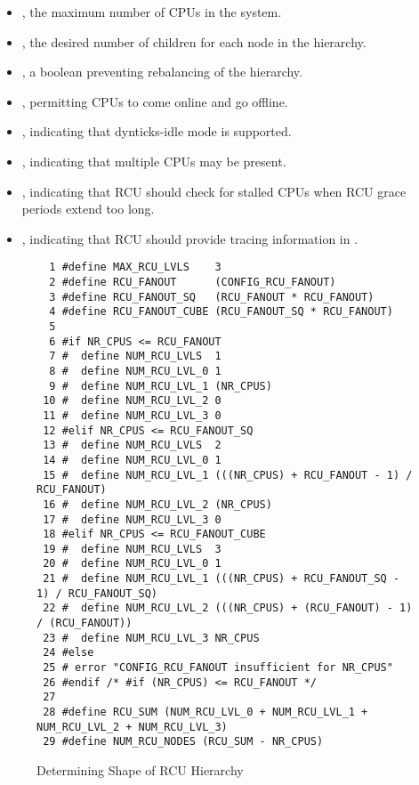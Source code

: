 \begin{itemize}
\item	{}, the maximum number of CPUs in the system.
\item	{}, the desired number of children for
	each node in the  hierarchy.
\item	{}, a boolean preventing rebalancing
	of the  hierarchy.
\item	{}, permitting CPUs to come online and go
	offline.
\item	{}, indicating that dynticks-idle mode is supported.
\item	{}, indicating that multiple CPUs may be present.
\item	{}, indicating that RCU should
	check for stalled CPUs when RCU grace periods extend too long.
\item	{}, indicating that RCU should provide
	tracing information in .
\end{itemize}

\begin{figure*}[tbp]
{
\scriptsize
\begin{verbatim}
  1 #define MAX_RCU_LVLS    3
  2 #define RCU_FANOUT      (CONFIG_RCU_FANOUT)
  3 #define RCU_FANOUT_SQ   (RCU_FANOUT * RCU_FANOUT)
  4 #define RCU_FANOUT_CUBE (RCU_FANOUT_SQ * RCU_FANOUT)
  5
  6 #if NR_CPUS <= RCU_FANOUT
  7 #  define NUM_RCU_LVLS  1
  8 #  define NUM_RCU_LVL_0 1
  9 #  define NUM_RCU_LVL_1 (NR_CPUS)
 10 #  define NUM_RCU_LVL_2 0
 11 #  define NUM_RCU_LVL_3 0
 12 #elif NR_CPUS <= RCU_FANOUT_SQ
 13 #  define NUM_RCU_LVLS  2
 14 #  define NUM_RCU_LVL_0 1
 15 #  define NUM_RCU_LVL_1 (((NR_CPUS) + RCU_FANOUT - 1) / RCU_FANOUT)
 16 #  define NUM_RCU_LVL_2 (NR_CPUS)
 17 #  define NUM_RCU_LVL_3 0
 18 #elif NR_CPUS <= RCU_FANOUT_CUBE
 19 #  define NUM_RCU_LVLS  3
 20 #  define NUM_RCU_LVL_0 1
 21 #  define NUM_RCU_LVL_1 (((NR_CPUS) + RCU_FANOUT_SQ - 1) / RCU_FANOUT_SQ)
 22 #  define NUM_RCU_LVL_2 (((NR_CPUS) + (RCU_FANOUT) - 1) / (RCU_FANOUT))
 23 #  define NUM_RCU_LVL_3 NR_CPUS
 24 #else
 25 # error "CONFIG_RCU_FANOUT insufficient for NR_CPUS"
 26 #endif /* #if (NR_CPUS) <= RCU_FANOUT */
 27
 28 #define RCU_SUM (NUM_RCU_LVL_0 + NUM_RCU_LVL_1 + NUM_RCU_LVL_2 + NUM_RCU_LVL_3)
 29 #define NUM_RCU_NODES (RCU_SUM - NR_CPUS)
\end{verbatim}
}
\caption{Determining Shape of RCU Hierarchy}
\label{fig:app:rcuimpl:rcutreewt:Determining Shape of RCU Hierarchy}
\end{figure*}

